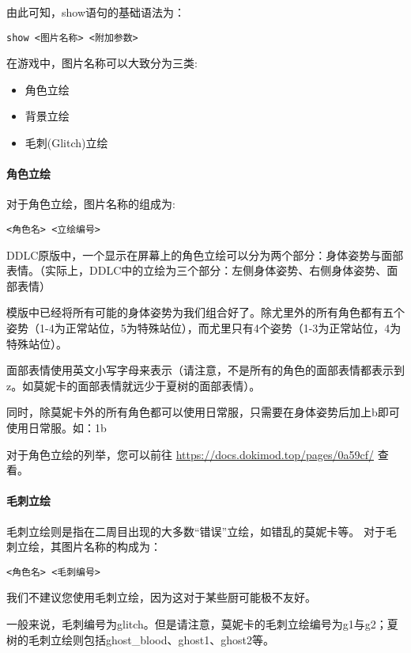 由此可知，show语句的基础语法为：
\begin{lstlisting}[numbers=none]
show <图片名称> <附加参数>
\end{lstlisting}

在游戏中，图片名称可以大致分为三类:
\begin{itemize}
    \item 角色立绘
    \item 背景立绘
    \item 毛刺(Glitch)立绘
\end{itemize}

\paragraph{角色立绘}\label{para:3.2.2.1}

对于角色立绘，图片名称的组成为:
\begin{lstlisting}[numbers=none]
<角色名> <立绘编号>
\end{lstlisting}

DDLC原版中，一个显示在屏幕上的角色立绘可以分为两个部分：身体姿势与面部表情。（实际上，DDLC中的立绘为三个部分：左侧身体姿势、右侧身体姿势、面部表情）

模版中已经将所有可能的身体姿势为我们组合好了。除尤里外的所有角色都有五个姿势（1-4为正常站位，5为特殊站位），而尤里只有4个姿势（1-3为正常站位，4为特殊站位）。

面部表情使用英文小写字母来表示（请注意，不是所有的角色的面部表情都表示到z。如莫妮卡的面部表情就远少于夏树的面部表情）。

同时，除莫妮卡外的所有角色都可以使用日常服，只需要在身体姿势后加上b即可使用日常服。如：1b

对于角色立绘的列举，您可以前往 \url{https://docs.dokimod.top/pages/0a59cf/} 查看。


\paragraph{毛刺立绘}

毛刺立绘则是指在二周目出现的大多数“错误”立绘，如错乱的莫妮卡等。
对于毛刺立绘，其图片名称的构成为：
\begin{lstlisting}[numbers=none]
<角色名> <毛刺编号>
\end{lstlisting}

\begin{Warning}
    我们不建议您使用毛刺立绘，因为这对于某些厨可能极不友好。
\end{Warning}

一般来说，毛刺编号为glitch。但是请注意，莫妮卡的毛刺立绘编号为g1与g2；夏树的毛刺立绘则包括ghost\_blood、ghost1、ghost2等。


